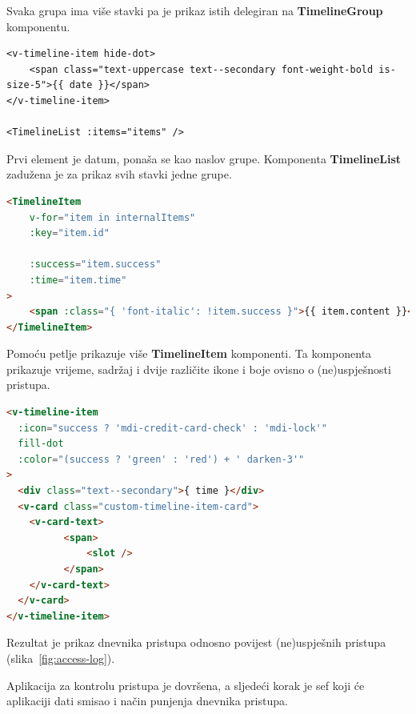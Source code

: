 Svaka grupa ima više stavki pa je prikaz istih delegiran na \textbf{TimelineGroup} komponentu.

\begin{lstlisting}
<v-timeline-item hide-dot>
    <span class="text-uppercase text--secondary font-weight-bold is-size-5">{{ date }}</span>
</v-timeline-item>

<TimelineList :items="items" />
\end{lstlisting}

Prvi element je datum, ponaša se kao naslov grupe.
Komponenta \textbf{TimelineList} zadužena je za prikaz svih stavki jedne grupe.

\begin{lstlisting}[language=HTML]
<TimelineItem
    v-for="item in internalItems"
    :key="item.id"

    :success="item.success"
    :time="item.time"
>
    <span :class="{ 'font-italic': !item.success }">{{ item.content }}</span>
</TimelineItem>
\end{lstlisting}

Pomoću petlje prikazuje više \textbf{TimelineItem} komponenti.
Ta komponenta prikazuje vrijeme, sadržaj i dvije različite ikone i boje ovisno o (ne)uspješnosti pristupa.

\begin{lstlisting}[language=HTML]
<v-timeline-item
  :icon="success ? 'mdi-credit-card-check' : 'mdi-lock'"
  fill-dot
  :color="(success ? 'green' : 'red') + ' darken-3'"
>
  <div class="text--secondary">{ time }</div>
  <v-card class="custom-timeline-item-card">
    <v-card-text>
          <span>
              <slot />
          </span>
    </v-card-text>
  </v-card>
</v-timeline-item>
\end{lstlisting}

Rezultat je prikaz dnevnika pristupa odnosno povijest (ne)uspješnih pristupa (slika~\ref{fig:access-log}).

Aplikacija za kontrolu pristupa je dovršena, a sljedeći korak je sef koji će aplikaciji dati smisao i način punjenja
dnevnika pristupa.
